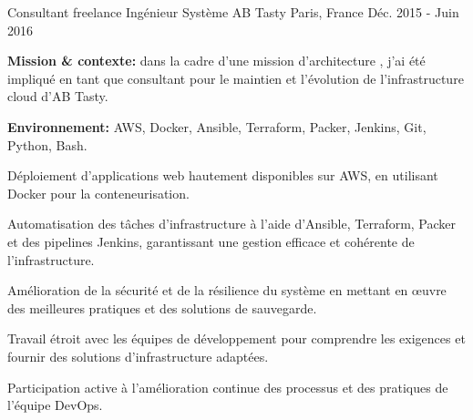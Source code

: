 \begin{cventries}
\cventry
{Consultant freelance Ingénieur Système} %
{AB Tasty} %
{Paris, France} %
{Déc. 2015 - Juin 2016} %
{
  \begin{cvitems} %
    \item {\textbf{Mission \& contexte:} dans la cadre d'une mission d'architecture , j'ai été impliqué en tant que consultant pour le maintien et l'évolution de l'infrastructure cloud d'AB Tasty.}
    \item {\textbf{Environnement:} AWS, Docker, Ansible, Terraform, Packer, Jenkins, Git, Python, Bash.}
    \item {Déploiement d'applications web hautement disponibles sur AWS, en utilisant Docker pour la conteneurisation.}
    \item {Automatisation des tâches d'infrastructure à l'aide d'Ansible, Terraform, Packer et des pipelines Jenkins, garantissant une gestion efficace et cohérente de l'infrastructure.}
    \item {Amélioration de la sécurité et de la résilience du système en mettant en œuvre des meilleures pratiques et des solutions de sauvegarde.}
    \item {Travail étroit avec les équipes de développement pour comprendre les exigences et fournir des solutions d'infrastructure adaptées.}
    \item {Participation active à l'amélioration continue des processus et des pratiques de l'équipe DevOps.}
  \end{cvitems}
}


\end{cventries}
